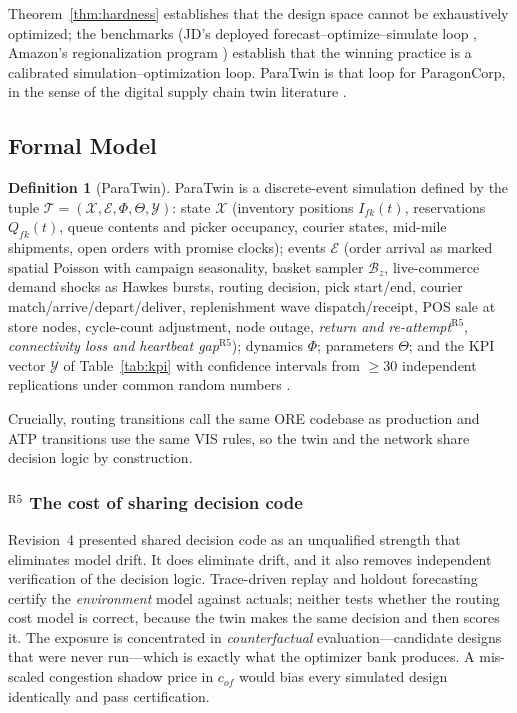 \documentclass[10pt,twocolumn,letterpaper]{article}
\theoremstyle{definition}
\newtheorem{definition}{Definition}
\begin{document}
Theorem~\ref{thm:hardness} establishes that the design space cannot be exhaustively optimized; the benchmarks (JD's deployed forecast--optimize--simulate loop \cite{wang2025}, Amazon's regionalization program \cite{chandra2026}) establish that the winning practice is a calibrated simulation--optimization loop. ParaTwin is that loop for ParagonCorp, in the sense of the digital supply chain twin literature \cite{ivanov2021,le2024,snoeck2022}.

\subsection{Formal Model}
\begin{definition}[ParaTwin]
ParaTwin is a discrete-event simulation \cite{law2015} defined by the tuple $\mathcal{T}=(\mathcal{X},\mathcal{E},\Phi,\Theta,\mathcal{Y})$: state $\mathcal{X}$ (inventory positions $I_{fk}(t)$, reservations $Q_{fk}(t)$, queue contents and picker occupancy, courier states, mid-mile shipments, open orders with promise clocks); events $\mathcal{E}$ (order arrival as marked spatial Poisson with campaign seasonality, basket sampler $\mathcal{B}_z$, live-commerce demand shocks as Hawkes bursts, routing decision, pick start/end, courier match/arrive/depart/deliver, replenishment wave dispatch/receipt, POS sale at store nodes, cycle-count adjustment, node outage, \emph{return and re-attempt}$^{\mathrm{R5}}$, \emph{connectivity loss and heartbeat gap}$^{\mathrm{R5}}$); dynamics $\Phi$; parameters $\Theta$; and the KPI vector $\mathcal{Y}$ of Table~\ref{tab:kpi} with confidence intervals from $\ge30$ independent replications under common random numbers \cite{law2015}.
\end{definition}

Crucially, routing transitions call the same ORE codebase as production and ATP transitions use the same VIS rules, so the twin and the network share decision logic by construction.

\subsubsection*{$^{\mathrm{R5}}$ The cost of sharing decision code}
Revision~4 presented shared decision code as an unqualified strength that eliminates model drift. It does eliminate drift, and it also removes independent verification of the decision logic. Trace-driven replay and holdout forecasting certify the \emph{environment} model against actuals; neither tests whether the routing cost model is correct, because the twin makes the same decision and then scores it. The exposure is concentrated in \emph{counterfactual} evaluation---candidate designs that were never run---which is exactly what the optimizer bank produces. A mis-scaled congestion shadow price in $c_{of}$ would bias every simulated design identically and pass certification.
\end{document}
